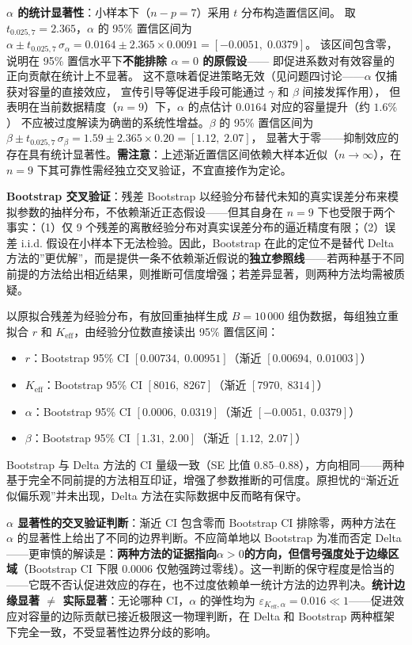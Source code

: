 \documentclass[12pt,a4paper]{ctexart}
\begin{document}
\begin{table}[htbp]
\textbf{$\alpha$ 的统计显著性}：小样本下（$n-p=7$）采用 $t$ 分布构造置信区间。
取 $t_{0.025,7}=2.365$，$\alpha$ 的 95\% 置信区间为
$\alpha \pm t_{0.025,7}\,\sigma_\alpha = 0.0164 \pm 2.365 \times 0.0091 = [-0.0051,\;0.0379]$。
该区间包含零，说明在 95\% 置信水平下\textbf{不能排除 $\alpha = 0$ 的原假设}——
即促进系数对有效容量的正向贡献在统计上不显著。
这不意味着促进策略无效（见问题四讨论——$\alpha$ 仅捕获对容量的直接效应，
宣传引导等促进手段可能通过 $\gamma$ 和 $\beta$ 间接发挥作用），
但表明在当前数据精度（$n=9$）下，$\alpha$ 的点估计 $0.0164$ 对应的容量提升（约 $1.6\%$）
不应被过度解读为确凿的系统性增益。$\beta$ 的 95\% 置信区间为
$\beta \pm t_{0.025,7}\,\sigma_\beta = 1.59 \pm 2.365 \times 0.20 = [1.12,\;2.07]$，
显著大于零——抑制效应的存在具有统计显著性。\textbf{需注意}：上述渐近置信区间依赖大样本近似（$n \to \infty$），在 $n=9$ 下其可靠性需经独立交叉验证，不宜直接作为定论。

\textbf{Bootstrap 交叉验证}：残差 Bootstrap\cite{efron} 以经验分布替代未知的真实误差分布来模拟参数的抽样分布，不依赖渐近正态假设——但其自身在 $n=9$ 下也受限于两个事实：（1）仅 9 个残差的离散经验分布对真实误差分布的逼近精度有限；（2）误差 i.i.d. 假设在小样本下无法检验。因此，Bootstrap 在此的定位不是替代 Delta 方法的''更优解''，而是提供一条不依赖渐近假说的\textbf{独立参照线}——若两种基于不同前提的方法给出相近结果，则推断可信度增强；若差异显著，则两种方法均需被质疑。

以原拟合残差为经验分布，有放回重抽样生成 $B=10\,000$ 组伪数据，每组独立重拟合 $r$ 和 $K_{\text{eff}}$，由经验分位数直接读出 95\% 置信区间：
\begin{itemize}
  \item $r$：Bootstrap 95\% CI $[0.00734,\;0.00951]$（渐近 $[0.00694,\;0.01003]$）
  \item $K_{\text{eff}}$：Bootstrap 95\% CI $[8016,\;8267]$（渐近 $[7970,\;8314]$）
  \item $\alpha$：Bootstrap 95\% CI $[0.0006,\;0.0319]$（渐近 $[-0.0051,\;0.0379]$）
  \item $\beta$：Bootstrap 95\% CI $[1.31,\;2.00]$（渐近 $[1.12,\;2.07]$）
\end{itemize}
Bootstrap 与 Delta 方法的 CI 量级一致（SE 比值 0.85--0.88），方向相同——两种基于完全不同前提的方法相互印证，增强了参数推断的可信度。原担忧的``渐近近似偏乐观''并未出现，Delta 方法在实际数据中反而略有保守。

\textbf{$\alpha$ 显著性的交叉验证判断}：渐近 CI 包含零而 Bootstrap CI 排除零，两种方法在 $\alpha$ 的显著性上给出了不同的边界判断。不应简单地以 Bootstrap 为准而否定 Delta——更审慎的解读是：\textbf{两种方法的证据指向$\alpha > 0$的方向，但信号强度处于边缘区域}（Bootstrap CI 下限 $0.0006$ 仅勉强跨过零线）。这一判断的保守程度是恰当的——它既不否认促进效应的存在，也不过度依赖单一统计方法的边界判决。\textbf{统计边缘显著 $\neq$ 实际显著}：无论哪种 CI，$\alpha$ 的弹性均为 $\varepsilon_{K_{\text{eff}},\alpha}=0.016 \ll 1$——促进效应对容量的边际贡献已接近极限这一物理判断，在 Delta 和 Bootstrap 两种框架下完全一致，不受显著性边界分歧的影响。


\end{table}
\end{document}
